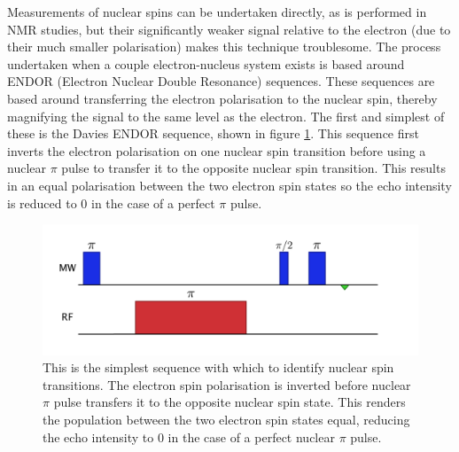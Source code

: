 Measurements of nuclear spins can be undertaken directly, as is performed in NMR studies, but their significantly weaker signal relative to the electron (due to their much smaller polarisation) makes this technique troublesome.
The process undertaken when a couple electron-nucleus system exists is based around ENDOR (Electron Nuclear Double Resonance) sequences.
These sequences are based around transferring the electron polarisation to the nuclear spin, thereby magnifying the signal to the same level as the electron.
The first and simplest of these is the Davies ENDOR sequence, shown in figure \ref{fig:DaviesENDOR}.
This sequence first inverts the electron polarisation on one nuclear spin transition before using a nuclear $\pi$ pulse to transfer it to the opposite nuclear spin transition.
This results in an equal polarisation between the two electron spin states so the echo intensity is reduced to 0 in the case of a perfect $\pi$ pulse.



\begin{figure}
\centering
\includegraphics[width=\columnwidth]{Figures/daviesENDOR.pdf}
\caption[Davies ENDOR sequence]{This is the simplest sequence with which to identify nuclear spin transitions. The electron spin polarisation is inverted before nuclear $\pi$ pulse transfers it to the opposite nuclear spin state. This renders the population between the two electron spin states equal, reducing the echo intensity to 0 in the case of a perfect nuclear $\pi$ pulse.}
\label{fig:DaviesENDOR}
\end{figure}

